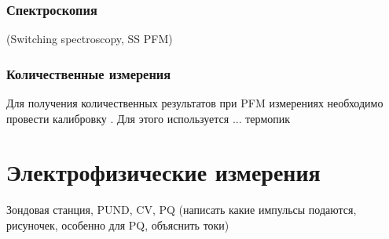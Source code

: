 \subsubsection{Спектроскопия}
(Switching spectroscopy, SS PFM)

\subsubsection{Количественные измерения}
Для получения количественных результатов при PFM измерениях необходимо провести калибровку . Для этого используется  ... термопик

\section{Электрофизические измерения}
Зондовая станция, PUND, CV, PQ (написать какие импульсы подаются, рисуночек, особенно для PQ, объяснить токи)


